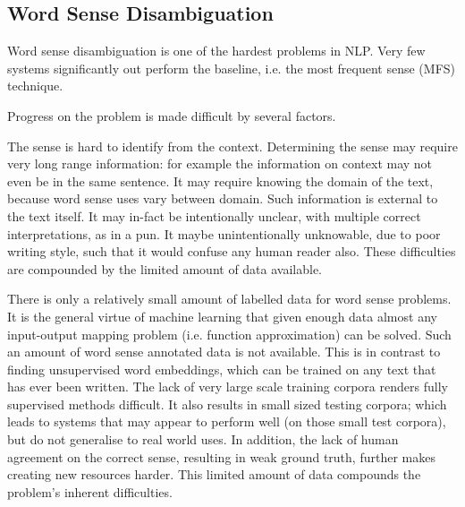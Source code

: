 \documentclass[12pt,parskip]{komatufte}
\begin{document}
\begin{figure}
{}
	
	
\end{figure}



\subsection{Word Sense Disambiguation}
Word sense disambiguation is one of the hardest problems in NLP.
Very few systems significantly out perform the baseline, i.e. the most frequent sense (MFS) technique.

Progress on the problem is made difficult by several factors.

The sense is hard to identify from the context.
Determining the sense may require very long range information:
for example the information on context may not even be in the same sentence.
It may require knowing the domain of the text, because word sense uses vary between domain.
Such information is external to the text itself.
It may in-fact be intentionally unclear, with multiple correct interpretations, as in a pun.
It maybe unintentionally unknowable, due to poor writing style, such that it would confuse any human reader also.
These difficulties are compounded by the limited amount of data available.

There is only a relatively small amount of labelled data for word sense problems.
It is the general virtue of machine learning that given enough data almost any input-output mapping problem (i.e. function approximation) can be solved.
Such an amount of word sense annotated data is not available.
This is in contrast to finding unsupervised word embeddings, which can be trained on any text that has ever been written.
The lack of very large scale training corpora renders fully supervised methods difficult.
It also results in small sized testing corpora; which leads to systems that may appear to perform well (on those small test corpora), but do not generalise to real world uses.
In addition, the lack of human agreement on the correct sense, resulting in weak ground truth, further makes creating new resources harder.
This limited amount of data compounds the problem's inherent difficulties.
\end{document}
